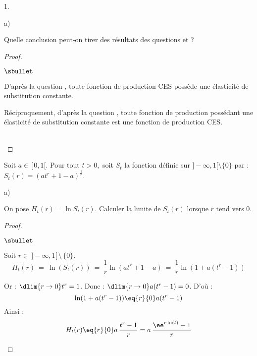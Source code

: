 \documentclass[11pt]{article}%
\begin{document}
\begin{noliste}{1.}
\begin{noliste}{a)}
  
  
  
  
  
  

  
  \item Quelle conclusion peut-on tirer des résultats des questions 
   et  ?
  
  \begin{proof}~
   \begin{noliste}{$\sbullet$}
    \item D'après la question , toute fonction de 
    production CES possède une élasticité de substitution constante.
    
    \item Réciproquement, d'après la question , toute
    fonction de production possédant une élasticité de 
    substitution constante est une fonction de production CES.
   \end{noliste}
   
   
   ~\\[-1.4cm]
  \end{proof}
 \end{noliste}
 
 \item Soit $a \in \ ]0,1[$. Pour tout $t>0,$ soit $S_t$ la fonction 
 définie sur $]-\infty,1[ \setminus \{0\}$ par : 
 $S_t(r)=(at^r+1-a)^{\frac{1}{r}}$.
 \begin{noliste}{a)}
  \setlength{\itemsep}{2mm}
  \item On pose $H_t(r)=\ln S_t(r)$. Calculer la limite de $S_t(r)$ 
  lorsque $r$ tend vers 0.
  
  \begin{proof}~
   \begin{noliste}{$\sbullet$}
    \item Soit $r\in \ ]-\infty,1[ \, \setminus \, \{0\}$.
    \[
     H_t(r) \ = \ \ln(S_t(r)) \ = \ \dfrac{1}{r} \ln(at^r +1-a)
     \ = \ \dfrac{1}{r} \ln(1+ a(t^r-1))
    \]
    
    \item Or : $\dlim{r\to 0} t^r=1$. Donc : 
    $\dlim{r\to 0} a(t^r-1)=0$. D'où :
    \[
     \ln(1+a(t^r-1)) \eq{r}{0} a(t^r-1)
    \]
    Ainsi :
    \[
     H_t(r) \eq{r}{0} a \, \dfrac{t^r-1}{r} = a \,
     \dfrac{\ee^{r \ln(t)}-1}{r}
    \]
    

\end{noliste}
\end{proof}
\end{noliste}
\end{noliste}
\end{document}
